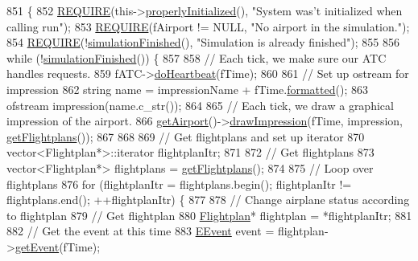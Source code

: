 \begin{DoxyCode}
851                                                            \{
852     \hyperlink{DesignByContract_8h_aeb774672b46dbe80afc14e0d1970f017}{REQUIRE}(this->\hyperlink{classSystem_af3eece83ba2d92a4a6b6c186d427c556}{properlyInitialized}(), \textcolor{stringliteral}{"System was't initialized when calling
       run"});
853     \hyperlink{DesignByContract_8h_aeb774672b46dbe80afc14e0d1970f017}{REQUIRE}(fAirport != NULL, \textcolor{stringliteral}{"No airport in the simulation."});
854     \hyperlink{DesignByContract_8h_aeb774672b46dbe80afc14e0d1970f017}{REQUIRE}(!\hyperlink{classSystem_abae43adfa434ace30ef85c69a7842289}{simulationFinished}(), \textcolor{stringliteral}{"Simulation is already finished"});
855 
856     \textcolor{keywordflow}{while} (!\hyperlink{classSystem_abae43adfa434ace30ef85c69a7842289}{simulationFinished}()) \{
857 
858         \textcolor{comment}{// Each tick, we make sure our ATC handles requests.}
859         fATC->\hyperlink{classATC_af85d95048677c52f411d25c910e999ef}{doHeartbeat}(fTime);
860 
861         \textcolor{comment}{// Set up ostream for impression}
862         \textcolor{keywordtype}{string} name = impressionName + fTime.\hyperlink{classTime_aeeb2d2b5a624d0d78b7f5d146d0682f5}{formatted}();
863         ofstream impression(name.c\_str());
864 
865         \textcolor{comment}{// Each tick, we draw a graphical impression of the airport.}
866         \hyperlink{classSystem_a8cd2a9b13cdbcf30f801e46cf8284800}{getAirport}()->\hyperlink{classAirport_a6bc9b678b5f9f0c9f2d9c179436766ef}{drawImpression}(fTime, impression, 
      \hyperlink{classSystem_a14a06028897516eb4df651220e70ce8f}{getFlightplans}());
867 
868 
869         \textcolor{comment}{// Get flightplans and set up iterator}
870         vector<Flightplan*>::iterator flightplanItr;
871 
872         \textcolor{comment}{// Get flightplans}
873         vector<Flightplan*> flightplans = \hyperlink{classSystem_a14a06028897516eb4df651220e70ce8f}{getFlightplans}();
874 
875         \textcolor{comment}{// Loop over flightplans}
876         \textcolor{keywordflow}{for} (flightplanItr = flightplans.begin(); flightplanItr != flightplans.end(); ++flightplanItr) \{
877 
878             \textcolor{comment}{// Change airplane status according to flightplan}
879             \textcolor{comment}{// Get flightplan}
880             \hyperlink{classFlightplan}{Flightplan}* flightplan = *flightplanItr;
881 
882             \textcolor{comment}{// Get the event at this time}
883             \hyperlink{Flightplan_8h_ab41c9a082b57fd41aefb64a57d8149f8}{EEvent} \textcolor{keyword}{event} = flightplan->\hyperlink{classFlightplan_a2b7410b0bcabb84db2164b4163dfddb4}{getEvent}(fTime);

\end{DoxyCode}
